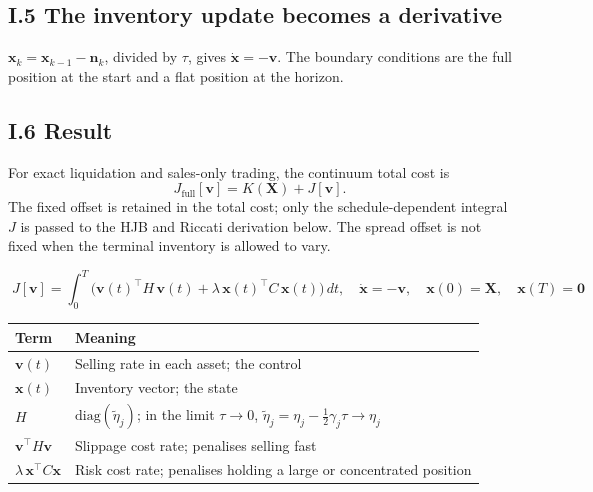 \documentclass[11pt,a4paper]{article}
\begin{document}
\subsection*{I.5 The inventory update becomes a derivative}

$\mathbf{x}_k=\mathbf{x}_{k-1}-\mathbf{n}_k$, divided by $\tau$, gives
$\dot{\mathbf{x}}=-\mathbf{v}$. The boundary conditions are the full position at
the start and a flat position at the horizon.

\subsection*{I.6 Result}

For exact liquidation and sales-only trading, the continuum total cost is
\begin{equation}
  J_{\mathrm{full}}[\mathbf v]=K(\mathbf X)+J[\mathbf v].
\end{equation}
The fixed offset is retained in the total cost; only the schedule-dependent
integral $J$ is passed to the HJB and Riccati derivation below. The spread
offset is not fixed when the terminal inventory is allowed to vary.

\begin{equation}
  \boxed{\;
  J[\mathbf{v}]
  = \int_0^T \Big( \mathbf{v}(t)^\top H\,\mathbf{v}(t)
      + \lambda\,\mathbf{x}(t)^\top C\,\mathbf{x}(t) \Big)\,dt,
  \quad \dot{\mathbf{x}}=-\mathbf{v},\quad
  \mathbf{x}(0)=\mathbf{X},\quad \mathbf{x}(T)=\mathbf{0}\;}
  \label{eq:J}
\end{equation}

\begin{center}
\begin{tabular}{@{}L{3.8cm}L{10cm}@{}}
\toprule
\textbf{Term} & \textbf{Meaning} \\
\midrule
$\mathbf{v}(t)$ & Selling rate in each asset; the control \\
$\mathbf{x}(t)$ & Inventory vector; the state \\
$H$ & $\mathrm{diag}(\tilde\eta_j)$; in the limit $\tau\to0$, $\tilde\eta_j=\eta_j-\tfrac12\gamma_j\tau\to\eta_j$ \\
$\mathbf{v}^\top H\mathbf{v}$ & Slippage cost rate; penalises selling fast \\
$\lambda\,\mathbf{x}^\top C\mathbf{x}$ & Risk cost rate; penalises holding a large or concentrated position \\
\bottomrule
\end{tabular}
\end{center}
\end{document}
